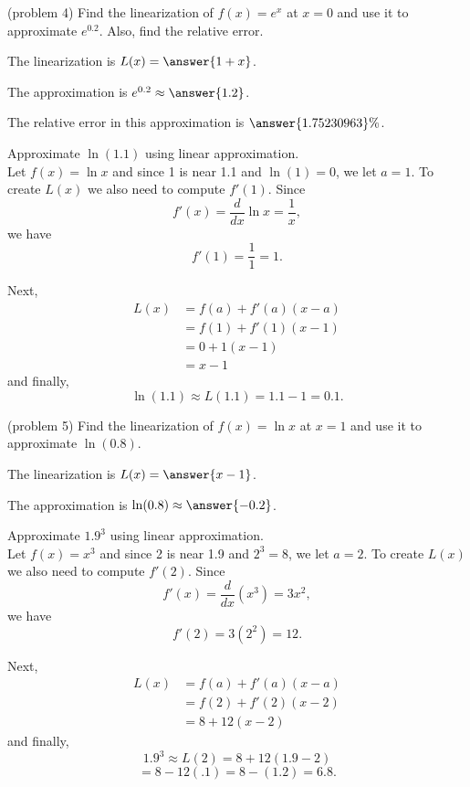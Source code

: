 \documentclass[handout]{ximera}
\begin{document}
 
 
 

\begin{problem}(problem 4)
Find the linearization of $f(x) = e^x$ at $x = 0$ and use it to approximate $e^{0.2}$.
Also, find the relative error.

The linearization is  $L(x) = \answer{1 + x}$.

The approximation is $e^{0.2} \approx \answer{1.2}$.

The relative error in this approximation is $\answer{1.75230963}\%$.


\end{problem}

\begin{example}[example 5]
Approximate $\ln(1.1)$ using linear approximation.\\ 
Let $f(x) = \ln x$ and since 1 is near 1.1 and $\ln(1) = 0$, we let 
$a = 1$. To create $L(x)$ we also need to compute $f'(1)$. 
Since 
\[f'(x) = \frac{d}{dx} \ln x = \frac{1}{x},\] 
we have
\[f'(1) = \frac{1}{1} = 1.\]

Next, 
\begin{align*}
L(x) &= f(a) + f'(a)(x - a) \\
&= f(1) + f'(1)(x - 1) \\
&= 0 + 1(x - 1)\\
&=x-1
\end{align*}
and finally,
\[\ln(1.1) \approx L(1.1) = 1.1 - 1 = 0.1.\]


\end{example}

\begin{problem}(problem 5)
Find the linearization of $f(x) = \ln x$ at $x = 1$ and use it to approximate $\ln(0.8)$.

The linearization is  $L(x) = \answer{x-1}$.

The approximation is $\ln(0.8) \approx \answer{-0.2}$.
\end{problem}

\begin{example}[example 6]
Approximate $1.9^3$ using linear approximation.\\ 
Let $f(x) = x^3$ and since 2 is near 1.9 and $2^3 = 8$, we let 
$a = 2$. To create $L(x)$ we also need to compute $f'(2)$. 
Since 
\[f'(x) = \frac{d}{dx} (x^3) = 3x^2,\] 
we have
\[f'(2) = 3(2^2) = 12.\]

Next, 
\begin{align*}
L(x) &= f(a) + f'(a)(x - a) \\
&= f(2) + f'(2)(x - 2) \\
&= 8 + 12(x - 2)
\end{align*}
and finally,
\[1.9^3 \approx L(2) = 8 + 12(1.9 - 2) \]
\[= 8 - 12(.1) = 8-(1.2) = 6.8.\]
\end{example}
\end{document}
